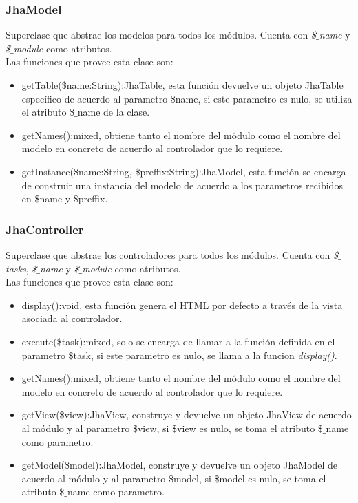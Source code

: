 \subsubsection{JhaModel}
Superclase que abstrae los modelos para todos los m\'odulos. Cuenta con \textit{\$$\_$name} y \textit{\$$\_$module} como atributos.\\
Las funciones que provee esta clase son:
\begin{itemize}
\item \textsf{getTable(\$name:String):JhaTable}, esta funci\'on devuelve un objeto JhaTable espec\'ifico de acuerdo al parametro \$name, si este parametro es nulo, se utiliza el atributo \$$\_$name de la clase.
\item \textsf{getNames():mixed}, obtiene tanto el nombre del m\'odulo como el nombre del modelo en concreto de acuerdo al controlador que lo requiere.
\item \textsf{getInstance(\$name:String, \$preffix:String):JhaModel}, esta funci\'on se encarga de construir una instancia del modelo de acuerdo a los parametros recibidos en \$name y \$preffix.
\end{itemize}

\subsubsection{JhaController}
Superclase que abstrae los controladores para todos los m\'odulos. Cuenta con \textit{\$$\_$tasks}, \textit{\$$\_$name} y \textit{\$$\_$module} como atributos.\\
Las funciones que provee esta clase son:
\begin{itemize}
\item \textsf{display():void}, esta funci\'on genera el HTML por defecto a trav\'es de la vista asociada al controlador.
\item \textsf{execute(\$task):mixed}, solo se encarga de llamar a la funci\'on definida en el parametro \$task, si este parametro es nulo, se llama a la funcion \textit{display()}.
\item \textsf{getNames():mixed}, obtiene tanto el nombre del m\'odulo como el nombre del modelo en concreto de acuerdo al controlador que lo requiere.
\item \textsf{getView(\$view):JhaView}, construye y devuelve un objeto JhaView de acuerdo al m\'odulo y al parametro \$view, si \$view es nulo, se toma el atributo \$$\_$name como parametro.
\item \textsf{getModel(\$model):JhaModel}, construye y devuelve un objeto JhaModel de acuerdo al m\'odulo y al parametro \$model, si \$model es nulo, se toma el atributo \$$\_$name como parametro.
\end{itemize}

